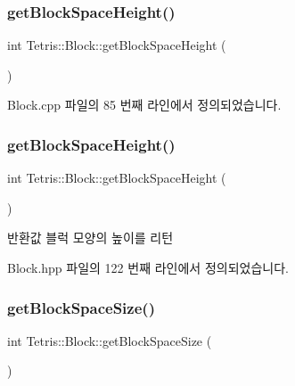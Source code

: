 \subsubsection{\texorpdfstring{get\+Block\+Space\+Height()}{getBlockSpaceHeight()}\hspace{0.1cm}{\footnotesize\ttfamily [1/2]}}
{\footnotesize\ttfamily int Tetris\+::\+Block\+::get\+Block\+Space\+Height (\begin{DoxyParamCaption}{ }\end{DoxyParamCaption})}



Block.\+cpp 파일의 85 번째 라인에서 정의되었습니다.

\mbox{\label{class_tetris_1_1_block_a5301977e32c03aaf122fa289fcba77ba}} 
\subsubsection{\texorpdfstring{get\+Block\+Space\+Height()}{getBlockSpaceHeight()}\hspace{0.1cm}{\footnotesize\ttfamily [2/2]}}
{\footnotesize\ttfamily int Tetris\+::\+Block\+::get\+Block\+Space\+Height (\begin{DoxyParamCaption}{ }\end{DoxyParamCaption})\hspace{0.3cm}{\ttfamily [inline]}}

\begin{DoxyReturn}{반환값}
블럭 모양의 높이를 리턴 
\end{DoxyReturn}


Block.\+hpp 파일의 122 번째 라인에서 정의되었습니다.

\mbox{\label{class_tetris_1_1_block_a356cba210ff93bbd80c10d4d00c81cc2}} 
\subsubsection{\texorpdfstring{get\+Block\+Space\+Size()}{getBlockSpaceSize()}\hspace{0.1cm}{\footnotesize\ttfamily [1/2]}}
{\footnotesize\ttfamily int Tetris\+::\+Block\+::get\+Block\+Space\+Size (\begin{DoxyParamCaption}{ }\end{DoxyParamCaption})}



